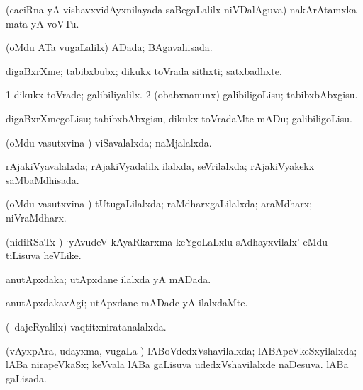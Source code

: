 \bentry
{}
\gl{\nA}
\expl{\Latin}
\bmng
(caciRna yA vishavxvidAyxnilayada saBegaLalilx niVDalAguva) nakArAtamxka mata yA voVTu. 
\emng
\eentry

\bentry
{}
\gl{\gu}
\bmng
(oMdu ATa \mo vugaLalilx) ADada; BAgavahisada. 
\emng
\eentry

\bentry
{}
\gl{\nA}
\bmng
digaBxrXme; tabibxbubx; dikukx toVrada sithxti; satxbadhxte. 
\emng

\noindent
\gl{\pagu}
\bmng
\bnum
\num{1}  dikukx toVrade; galibiliyalilx. 
\num{2} (obabxnanunx) galibiligoLisu; tabibxbAbxgisu. 
\enum
\emng
\eentry

\bentry
{}
\gl{\sakirx}
\bmng
digaBxrXmegoLisu; tabibxbAbxgisu, dikukx toVradaMte mADu; galibiligoLisu. 
\emng
\eentry

\bentry
{}
\gl{\gu}
\bmng
(oMdu vasutxvina \vi) viSavalalxda; naMjalalxda. 
\emng
\eentry

\bentry
{}
\gl{\gu}
\bmng
rAjakiVyavalalxda; rAjakiVyadalilx ilalxda, seVrilalxda; rAjakiVyakekx saMbaMdhisada. 
\emng
\eentry

\bentry
{}
\gl{\gu}
\bmng
(oMdu vasutxvina \vi) tUtugaLilalxda; raMdharxgaLilalxda; araMdharx; niVraMdharx. 
\emng
\eentry

\bentry
{}
\gl{\nA}
\expl{\Latin}
\bmng
(nidiRSaTx \vi) `yAvudeV kAyaRkarxma keYgoLaLxlu sAdhayxvilalx' eMdu tiLisuva heVLike. 
\emng
\eentry

\bentry
{}
\gl{\gu}
\bmng
anutApxdaka; utApxdane ilalxda yA mADada. 
\emng
\eentry

\bentry
{}
\gl{\kirxvi}
\bmng
anutApxdakavAgi; utApxdane mADade yA ilalxdaMte. 
\emng
\eentry

\bentry
{}
\gl{\gu}
\bmng
(\kanmu\ dajeRyalilx) vaqtitxniratanalalxda. 
\emng
\eentry

\bentry
{}
\gl{\gu}
\bmng
(vAyxpAra, udayxma, \mo vugaLa \vi) 
\banum
{} lABoVdedxVshavilalxda; lABApeVkeSxyilalxda; lABa nirapeVkaSx; keVvala lABa gaLisuva udedxVshavilalxde naDesuva. 
 lABa gaLisada. 
\eanum
\emng
\eentry

